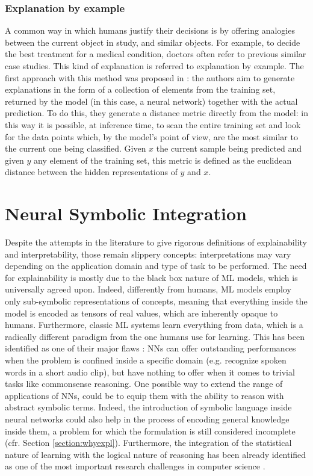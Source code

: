 \subsubsection{Explanation by example}
A common way in which humans justify their decisions is by offering analogies between the current object in study, and similar objects. For example, to decide the best treatment for a medical condition, doctors often refer to previous similar case studies. This kind of explanation is referred to explanation by example. The first approach with this method was proposed in \cite{caruana1999case}: the authors aim to generate explanations in the form of a collection of elements from the training set, returned by the model (in this case, a neural network) together with the actual prediction. To do this, they generate a distance metric directly from the model: in this way it is possible, at inference time, to scan the entire training set and look for the data points which, by the model's point of view, are the most similar to the current one being classified. Given $x$ the current sample being predicted and given $y$ any element of the training set, this metric is defined as the euclidean distance between the hidden representations of $y$ and $x$.

\section{Neural Symbolic Integration}
Despite the attempts in the literature to give rigorous definitions of explainability and interpretability, those remain slippery concepts: interpretations may vary depending on the application domain and type of task to be performed. The need for explainability is mostly due to the black box nature of ML models, which is universally agreed upon. Indeed, differently from humans, ML models employ only sub-symbolic representations of concepts, meaning that everything inside the model is encoded as tensors of real values, which are inherently opaque to humans. Furthermore, classic ML systems learn everything from data, which is a radically different paradigm from the one humans use for learning. This has been identified as one of their major flaws \cite{marcus2018appraisal}: NNs can offer outstanding performances when the problem is confined inside a specific domain (e.g. recognize spoken words in a short audio clip), but have nothing to offer when it comes to trivial tasks like commonsense reasoning. One possible way to extend the range of applications of NNs, could be to equip them with the ability to reason with abstract symbolic terms. Indeed, the introduction of symbolic language inside neural networks could also help in the process of encoding general knowledge inside them, a problem for which the formulation is still considered incomplete (cfr. Section \ref{section:whyexpl}). Furthermore, the integration of the statistical nature of learning with the logical nature of reasoning has been already identified as one of the most important research challenges in computer science \cite{valiant2003threeproblems}.

